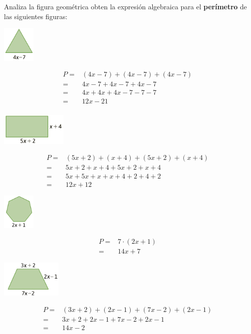 Analiza la figura geométrica obten la expresión algebraica para el \textbf{perímetro} de las siguientes figuras:

\begin{multicols}{2}
    \begin{parts}
        {\printanswers
            \centering \includegraphics[width=0.12\textwidth]{../images/20230319042651}
            \begin{solutionbox}{3.5cm}\begin{align*}P=&(4x-7)+(4x-7)+(4x-7)\\=&4x-7+4x-7+4x-7\\=&4x+4x+4x-7-7-7\\=&12x-21\\    \end{align*}\end{solutionbox}
        }

        \centering \includegraphics[width=0.24\textwidth]{../images/20230319042710}
        \begin{solutionbox}{3.5cm}\begin{align*}P=&(5x+2)+(x+4)+(5x+2)+(x+4)\\=&5x+2+x+4+5x+2+x+4\\=&5x +5x+x+x +4 +2 +4+2 \\=&12x+12 \end{align*}\end{solutionbox}

        \centering \includegraphics[width=0.12\textwidth]{../images/20230319042701}
        \begin{solutionbox}{3cm}\begin{align*}P=&7 \cdot (2x+1)\\=&14x+7     \end{align*}\end{solutionbox}

        \centering \includegraphics[width=0.22\textwidth]{../images/20230319042717}
        \begin{solutionbox}{3cm}\begin{align*}P=&(3x+2)+(2x-1)+(7x-2)+(2x-1)\\=&3x+2+2x-1+7x-2+2x-1\\=&14x-2\end{align*}\end{solutionbox}

    \end{parts}
\end{multicols}

